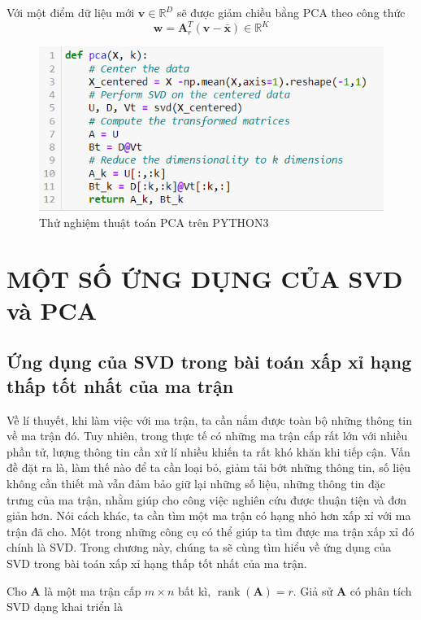 \documentclass[14pt,oneside,a4paper]{report}
\numberwithin{equation}{section}
\def\R{\mathbb{R}}
\begin{document}
Với một điểm dữ liệu mới $\mathbf{v} \in \R^D$ sẽ
được giảm chiều bằng PCA theo công thức 
\begin{equation} \label{chieu}
\mathbf{w} = \mathbf{A}_r^T(\mathbf{v} - \bar{\mathbf{x}}) \in
\R^K
\end{equation} 
\begin{figure}[htp]
\centering
\includegraphics[scale=0.9]{implement_pca.png}
\caption{Thử nghiệm thuật toán PCA trên PYTHON3}
\label{fig:pca_example}
\end{figure}
\chapter{ MỘT SỐ ỨNG DỤNG CỦA SVD và PCA }

\section{Ứng dụng của SVD trong bài toán xấp xỉ hạng thấp tốt nhất của ma trận}

Về lí thuyết, khi làm việc với ma trận, ta cần nắm được toàn bộ những thông tin về ma trận đó. Tuy nhiên, trong thực tế có những ma trận cấp rất lớn với nhiều phần tử, lượng thông tin cần xử lí nhiều khiến ta rất khó khăn khi tiếp cận. Vấn đề đặt ra là, làm thế nào để ta cần loại bỏ, giảm tải bớt những thông tin, số liệu không cần thiết mà vẫn đảm bảo giữ lại những số liệu, những thông tin đặc trưng của ma trận, nhằm giúp cho công việc nghiên cứu được thuận tiện và đơn giản hơn. Nói cách khác, ta cần tìm một ma trận có hạng nhỏ hơn xấp xỉ với ma trận đã cho. Một trong những công cụ có thể giúp ta tìm được ma trận xấp xỉ đó chính là SVD. Trong chương này, chúng ta sẽ cùng tìm hiểu về ứng dụng của SVD trong bài toán xấp xỉ hạng thấp tốt nhất của ma trận. 

Cho $\mathbf{A}$ là một ma trận cấp $m \times n$ bất kì, $\operatorname{rank}(\mathbf{A})=r$. Giả sử $\mathbf{A}$ có phân tích SVD dạng khai triển là
\end{document}

